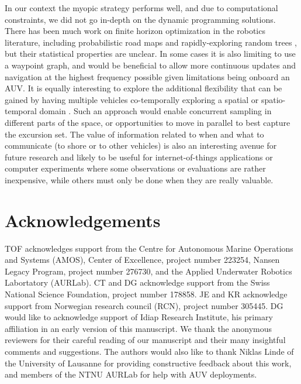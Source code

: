 \documentclass[aoas]{imsart}
\begin{document}
In our context the myopic strategy performs well, and due to
computational constraints, we did not go in-depth on the dynamic
programming solutions. There has been much work on finite horizon
optimization in the robotics literature, including probabilistic road
maps and rapidly-exploring random trees \citep{karaman2011sampling},
but their statistical properties are unclear.  In some cases it is
also limiting to use a waypoint graph, and would be beneficial to
allow more continuous updates and navigation at the highest frequency
possible given limitations being onboard an AUV.  It is equally
interesting to explore the additional flexibility that can be gained
by having multiple vehicles co-temporally exploring a spatial or
spatio-temporal domain \citep{ferreira2019advancing}. Such an approach
would enable concurrent sampling in different parts of the space, or
opportunities to move in parallel to best capture the excursion set.
The value of information related to when and what to communicate (to
shore or to other vehicles) is also an interesting avenue for future research
and likely to be useful for internet-of-things applications or
computer experiments where some observations or evaluations are rather
inexpensive, while others must only be done when they are really
valuable.


\section*{Acknowledgements}

TOF acknowledges support from the Centre for Autonomous Marine
Operations and Systems (AMOS), Center of Excellence, project number
223254, Nansen Legacy Program, project number 276730, and the Applied
Underwater Robotics Labortatory (AURLab). CT and DG acknowledge
support from the Swiss National Science Foundation, project number
178858. JE and KR acknowledge support from Norwegian research council
(RCN), project number 305445. DG would like to acknowledge support of
Idiap Research Institute, his primary affiliation in an early version
of this manuscript. We thank the anonymous reviewers for their careful
reading of our manuscript and their many insightful comments and
suggestions. The authors would also like to thank Niklas Linde of the
University of Lausanne for providing constructive feedback about this
work, and members of the NTNU AURLab for help with AUV deployments.

\begin{supplement}
\end{supplement}

\footnotesize



% 
\end{document}
